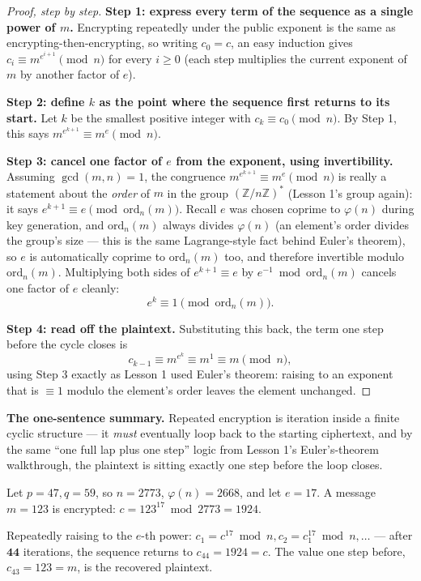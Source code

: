 \begin{proof}[Proof, step by step]
\textbf{Step 1: express every term of the sequence as a single power of $m$.} Encrypting repeatedly under the public exponent is the same as encrypting-then-encrypting, so writing $c_0=c$, an easy induction gives $c_i \equiv m^{e^{i+1}} \pmod n$ for every $i\ge0$ (each step multiplies the current exponent of $m$ by another factor of $e$).

\textbf{Step 2: define $k$ as the point where the sequence first returns to its start.} Let $k$ be the smallest positive integer with $c_k \equiv c_0 \pmod n$. By Step 1, this says $m^{e^{k+1}} \equiv m^{e} \pmod n$.

\textbf{Step 3: cancel one factor of $e$ from the exponent, using invertibility.} Assuming $\gcd(m,n)=1$, the congruence $m^{e^{k+1}}\equiv m^e\pmod n$ is really a statement about the \emph{order} of $m$ in the group $(\mathbb{Z}/n\mathbb{Z})^{*}$ (Lesson 1's group again): it says $e^{k+1}\equiv e\pmod{\mathrm{ord}_n(m)}$. Recall $e$ was chosen coprime to $\varphi(n)$ during key generation, and $\mathrm{ord}_n(m)$ always divides $\varphi(n)$ (an element's order divides the group's size — this is the same Lagrange-style fact behind Euler's theorem), so $e$ is automatically coprime to $\mathrm{ord}_n(m)$ too, and therefore invertible modulo $\mathrm{ord}_n(m)$. Multiplying both sides of $e^{k+1}\equiv e$ by $e^{-1}\bmod\mathrm{ord}_n(m)$ cancels one factor of $e$ cleanly:
\[
e^{k} \equiv 1 \pmod{\mathrm{ord}_n(m)}.
\]

\textbf{Step 4: read off the plaintext.} Substituting this back, the term one step before the cycle closes is
\[
c_{k-1} \equiv m^{e^{k}} \equiv m^{1} \equiv m \pmod n,
\]
using Step 3 exactly as Lesson 1 used Euler's theorem: raising to an exponent that is $\equiv1$ modulo the element's order leaves the element unchanged.
\end{proof}

\medskip\noindent\textbf{The one-sentence summary.} Repeated encryption is iteration inside a finite cyclic structure — it \emph{must} eventually loop back to the starting ciphertext, and by the same ``one full lap plus one step'' logic from Lesson 1's Euler's-theorem walkthrough, the plaintext is sitting exactly one step before the loop closes.

\begin{example}
Let $p=47, q=59$, so $n=2773$, $\varphi(n)=2668$, and let $e=17$. A message $m=123$ is encrypted: $c = 123^{17} \bmod 2773 = 1924$.

Repeatedly raising to the $e$-th power: $c_1 = c^{17} \bmod n, c_2 = c_1^{17} \bmod n, \dots$ — after $\mathbf{44}$ iterations, the sequence returns to $c_{44} = 1924 = c$. The value one step before, $c_{43} = 123 = m$, is the recovered plaintext.
\end{example}

